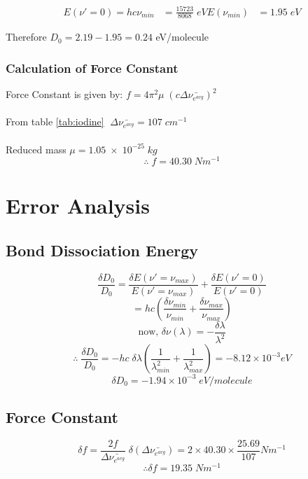     \begin{align*}
    E(\nu'=0)=hc\nu_{min}&=\frac{15723}{8068}\;eV
    E(\nu_{min})&=1.95\;eV
    \end{align*}

    Therefore $D_0 = 2.19 - 1.95 = 0.24$ eV/molecule

    \subsubsection{Calculation of Force Constant}
    \noindent Force Constant is given by: $f=4\pi^2 \mu\;(c\Delta\bar{\nu_{e^{avg}}})^2$\\\\
    From table \ref{tab:iodine} $\;\Delta\bar{\nu_{e^{avg}}} = 107\;cm^{-1}$\\\\
    Reduced mass $\mu= 1.05\; \times\; 10^{-25}\; kg $\\
    \[\therefore\;f=40.30\;N m^{-1}\]

    \section{Error Analysis}

    \subsection{Bond Dissociation Energy}
        $$\frac{\delta D_0}{D_0} = \frac{\delta E(\nu'=\nu_{max})}{E(\nu'=\nu_{max})} + \frac{\delta E(\nu'=0)}{E(\nu'=0)}$$ 
        $$= hc\left(\frac{\delta \nu_{min}}{\nu_{min}} + \frac{\delta \nu_{max}}{\nu_{max}}\right)$$
        $$\text{now, }\delta \nu (\lambda)= -\frac{\delta\lambda}{\lambda^2}$$
        $$\therefore\; \frac{\delta D_0}{D_0} = -hc\;\delta\lambda\left(\frac{1}{\lambda_{min}^2} + \frac{1}{\lambda_{max}^2}\right) = -8.12\times10^{-3}eV$$
        $$\delta D_0 = -1.94\times10^{-3}\;eV/molecule$$

    \subsection{Force Constant}
        $$\delta f = \frac{2f}{\Delta\bar{\nu_{e^{avg}}}} \; \delta(\Delta\bar{\nu_{e^{avg}}}) = 2\times 40.30 \times \frac{25.69}{107} Nm^{-1}$$
        $$\therefore \delta f = 19.35\;N m^{-1}$$